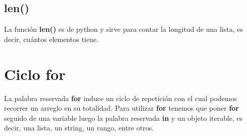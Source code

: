 \documentclass[letterpaper, 12pt, oneside]{article}%
\begin{document}
	\subsection{len()}
	La función \textbf{len()} es de python y sirve para contar la longitud de una lista, es decir, cuántos elementos tiene.
	\section{Ciclo for}
	La palabra reservada \textbf{for} induce un ciclo de repetición con el cual podemos recorrer un arreglo en su totalidad. Para utilizar \textbf{for} tenemos que poner \textbf{for} seguido de una variable luego la palabra reservada \textbf{in} y un objeto iterable, es decir, una lista, un string, un rango, entre otros.
	
	
	
\end{document}

